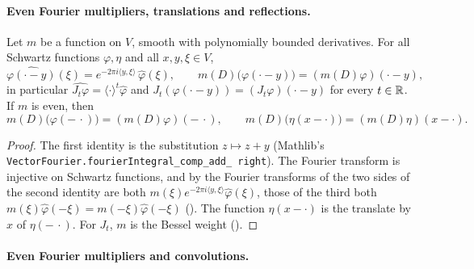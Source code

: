 \paragraph{Even Fourier multipliers, translations and reflections.}

\begin{lemma}
\label{lem:bessel-schwartz-translation}
\leanok
{}
Let $m$ be a function on $V$, smooth with polynomially bounded derivatives. For all Schwartz
functions $\varphi, \eta$ and all $x, y, \xi \in V$,
\[
  \widehat{\varphi(\cdot - y)}(\xi) = e^{-2\pi i \langle y, \xi \rangle} \,
  \widehat\varphi(\xi), \qquad
  m(D) \bigl(\varphi(\cdot - y)\bigr) = (m(D) \varphi)(\cdot - y),
\]
in particular $\widehat{J_t \varphi} = \langle \cdot \rangle^t \widehat\varphi$ and
$J_t (\varphi(\cdot - y)) = (J_t \varphi)(\cdot - y)$ for every $t \in \mathbb{R}$. If $m$ is even, then
\[
  m(D) \bigl(\varphi(-\,\cdot)\bigr) = (m(D) \varphi)(-\,\cdot), \qquad
  m(D) \bigl(\eta(x - \cdot)\bigr) = (m(D) \eta)(x - \cdot) .
\]
\end{lemma}

\begin{proof}
\leanok
The first identity is the substitution $z \mapsto z + y$ (Mathlib's
\texttt{VectorFourier.\allowbreak fourierIntegral\_\allowbreak comp\_\allowbreak add\_\allowbreak
right}). The Fourier transform is injective on Schwartz functions, and by
 the Fourier transforms of the two sides of the second
identity are both $m(\xi) e^{-2\pi i \langle y, \xi \rangle} \widehat\varphi(\xi)$, those
of the third both $m(\xi) \widehat\varphi(-\xi) = m(-\xi) \widehat\varphi(-\xi)$
(). The function $\eta(x - \cdot)$ is the translate by $x$ of
$\eta(-\,\cdot)$. For $J_t$, $m$ is the Bessel weight ().
\end{proof}

\paragraph{Even Fourier multipliers and convolutions.}

